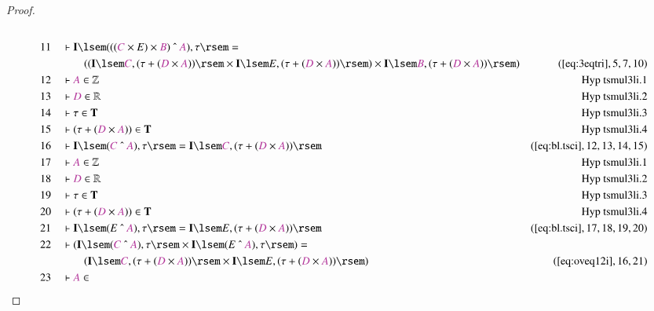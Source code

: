 \begin{proof}
\begin{align}
  \\ 11 &&  & \vdash \mathbf{I} \lsem ( ( ( \mc{C} \times E ) \times \mc{B} )
      ~\string^~ \mc{A} ) , \tau \rsem =  \notag \\ & & & \qquad
     ( ( \mathbf{I}
      \lsem \mc{C} , ( \tau + ( \mc{D} \times \mc{A} ) )
      \rsem \times \mathbf{I} \lsem E , ( \tau + ( \mc{D}
      \times \mc{A} ) ) \rsem ) \times \mathbf{I} \lsem
      \mc{B} , ( \tau + ( \mc{D} \times \mc{A} ) ) \rsem
      )&(\mbox{\ref{eq:3eqtri}},5,7,10)\notag
  \\ 12 &&  & \vdash \mc{A} \in
      \mathbb{Z}&\text{Hyp~tsmul3li.1}\notag%
  \\ 13 &&  & \vdash \mc{D} \in
      \mathbb{R}&\text{Hyp~tsmul3li.2}\notag%
  \\ 14 &&  & \vdash \tau \in
      \mathbf{T}&\text{Hyp~tsmul3li.3}\notag%
  \\ 15 &&  & \vdash ( \tau + ( \mc{D} \times \mc{A} ) ) \in
      \mathbf{T}&\text{Hyp~tsmul3li.4}\notag%
  \\ 16 &&  & \vdash \mathbf{I} \lsem ( \mc{C} ~\string^~ \mc{A} ) , \tau \rsem
      = \mathbf{I} \lsem \mc{C} , ( \tau + ( \mc{D} \times
      \mc{A} ) )
      \rsem&(\mbox{\ref{eq:bl.tsci}},12,13,14,15)\notag
  \\ 17 &&  & \vdash \mc{A} \in
      \mathbb{Z}&\text{Hyp~tsmul3li.1}\notag%
  \\ 18 &&  & \vdash \mc{D} \in
      \mathbb{R}&\text{Hyp~tsmul3li.2}\notag%
  \\ 19 &&  & \vdash \tau \in
      \mathbf{T}&\text{Hyp~tsmul3li.3}\notag%
  \\ 20 &&  & \vdash ( \tau + ( \mc{D} \times \mc{A} ) ) \in
      \mathbf{T}&\text{Hyp~tsmul3li.4}\notag%
  \\ 21 &&  & \vdash \mathbf{I} \lsem ( E ~\string^~ \mc{A} ) , \tau \rsem =
      \mathbf{I} \lsem E , ( \tau + ( \mc{D} \times \mc{A} )
      ) \rsem&(\mbox{\ref{eq:bl.tsci}},17,18,19,20)\notag
  \\ 22 &&  & \vdash ( \mathbf{I} \lsem ( \mc{C} ~\string^~ \mc{A} ) , \tau
      \rsem \times \mathbf{I} \lsem ( E ~\string^~ \mc{A} )
      , \tau \rsem ) =  \notag \\ & & & \qquad
     ( \mathbf{I} \lsem \mc{C} , ( \tau +
      ( \mc{D} \times \mc{A} ) ) \rsem \times \mathbf{I}
      \lsem E , ( \tau + ( \mc{D} \times \mc{A} ) ) \rsem
      )&(\mbox{\ref{eq:oveq12i}},16,21)\notag
  \\ 23 &&  & \vdash \mc{A} \in

\end{align}
\end{proof}
